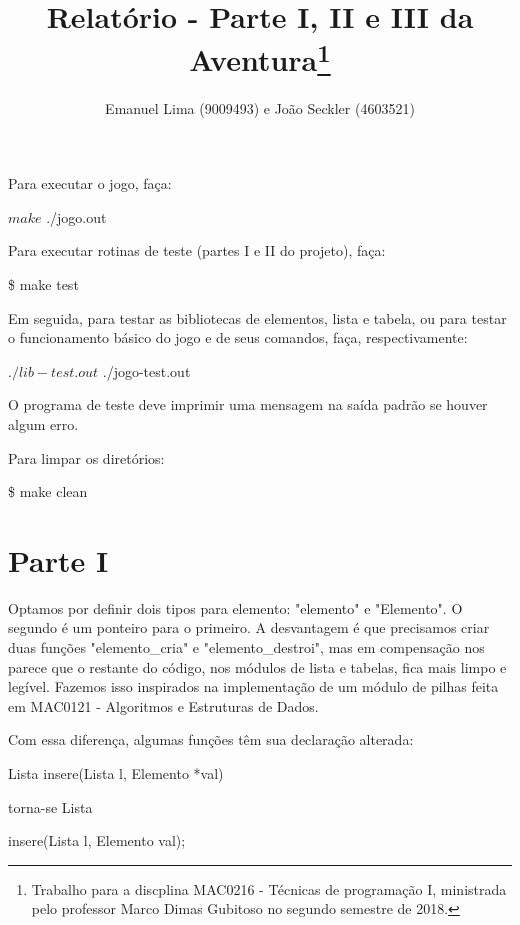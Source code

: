 \documentclass{article}
\title{Relatório - Parte I, II e III da Aventura\footnote{Trabalho para a discplina
    MAC0216 - Técnicas de programação I, ministrada pelo professor Marco Dimas
    Gubitoso no segundo semestre de 2018.}}
\author{Emanuel Lima (9009493) e João Seckler (4603521)}
\begin{document}
\maketitle

Para executar o jogo, faça:

\begin{spverbatim}
  $ make
  $ ./jogo.out
\end{spverbatim}
\medskip

Para executar rotinas de teste (partes I e II do projeto), faça:

\begin{spverbatim}
  \$ make test
\end{spverbatim}
\medskip

Em seguida, para testar as bibliotecas de elementos, lista e tabela, ou para
testar o funcionamento básico do jogo e de seus comandos, faça, respectivamente:

\begin{spverbatim}
  $ ./lib-test.out
  $ ./jogo-test.out
\end{spverbatim}
\medskip

O programa de teste deve imprimir uma mensagem na saída padrão se houver algum
erro.

Para limpar os diretórios:

\begin{spverbatim}
  \$ make clean 
\end{spverbatim}
\medskip


\section{Parte I}

Optamos por definir dois tipos para elemento: "elemento" e "Elemento". O segundo é um ponteiro para o primeiro. A desvantagem é que precisamos criar duas funções "elemento\_cria" e "elemento\_destroi", mas em compensação nos parece que o restante do código, nos módulos de lista e tabelas, fica mais limpo e legível. Fazemos isso inspirados na implementação de um módulo de pilhas feita em MAC0121 - Algoritmos e Estruturas de Dados.

Com essa diferença, algumas funções têm sua declaração alterada:

\begin{spverbatim}
  Lista insere(Lista l, Elemento *val)
\end{spverbatim} \medskip
torna-se Lista
\begin{spverbatim}
  insere(Lista l, Elemento val);
\end{spverbatim} \medskip
\end{document}
